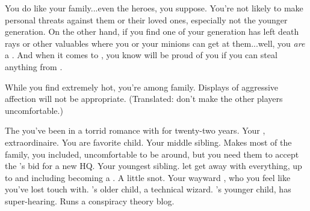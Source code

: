 \documentclass[char]{LRSguildcamp1}
\begin{document}
\begin{itemz}[Notes]
	\item You do like your family...even the heroes, you suppose.  You're not likely to make personal threats against them or their loved ones, especially not the younger generation.  On the other hand, if you find one of your generation has left death rays or other valuables where you or your minions can get at them...well, you \emph{are} a \cOldest{\villain}.  And when it comes to \cGrandma{\Parent}, you know \cGrandma{\they} will be proud of you if you can steal anything from \cGrandma{\them}.
	\item While you find \cOS{} extremely hot, you're among family.  Displays of aggressive affection will not be appropriate.  (Translated: don't make the other players uncomfortable.)
\end{itemz}

\begin{contacts}
	\contact{\cOS{}} The \cOS{\hero} you've been in a torrid romance with for twenty-two years.
	\contact{\cGrandma{}} Your \cGrandma{\parent}, \cGrandma{\villain} extraordinaire.  You are \cGrandma{\their} favorite child.
	\contact{\cArchitect{}} Your middle sibling.  Makes most of the family, you included, uncomfortable to be around, but you need them to accept the \cVillainCompact{\intro}'s bid for a new HQ.
	\contact{\cYoungest{}} Your youngest sibling.  \cGrandma{\Parent} let \cYoungest{\them} get away with everything, up to and including becoming a \cYoungest{\hero}.  A little snot.
	\contact{\cGrad{}} Your wayward \cGrad{\offspring}, who you feel like you've lost touch with.
	\contact{\cTeen{}} \cArchitect{}'s older child, a technical wizard.
	\contact{\cTween{}} \cArchitect{}'s younger child, has super-hearing.  Runs a conspiracy theory blog.  
\end{contacts}
\end{document}
